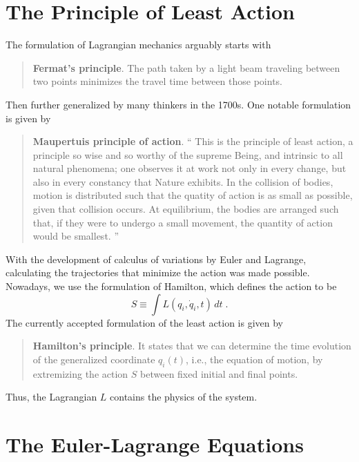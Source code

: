 	\section{The Principle of Least Action}
	The formulation of Lagrangian mechanics arguably starts with
	\begin{quote}
		\textbf{Fermat's principle}. The path taken by a light beam traveling between two points minimizes the travel time between those points.
	\end{quote}
	Then further generalized by many thinkers in the 1700s. One notable formulation is given by
	\begin{quote}
		\textbf{Maupertuis principle of action}. `` This is the principle of least action, a principle so wise and so worthy of the supreme Being, and intrinsic to all natural phenomena; one observes it at work not only in every change, but also in every constancy that Nature exhibits. In the collision of bodies, motion is distributed such that the quatity of action is as small as possible, given that collision occurs. At equilibrium, the bodies are arranged such that, if they were to undergo a small movement, the quantity of action would be smallest. ''
	\end{quote}
	With the development of calculus of variations by Euler and Lagrange, calculating the trajectories that minimize the action was made possible. Nowadays, we use the formulation of Hamilton, which defines the action to be
	\begin{equation}
		S\equiv\int L(q_i,\dot{q}_i,t) \, dt \;.
	\end{equation}
	The currently accepted formulation of the least action is given by
	\begin{quote}
		\textbf{Hamilton's principle}. It states that we can determine the time evolution of the generalized coordinate $q_i(t)$, i.e., the equation of motion, by extremizing the action $S$ between fixed initial and final points.
	\end{quote}
	Thus, the Lagrangian $L$ contains the physics of the system.
	
	\section{The Euler-Lagrange Equations}
	